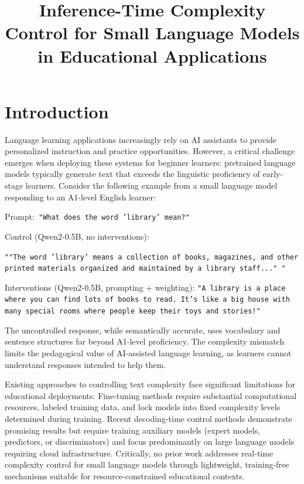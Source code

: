 \documentclass[10pt, a4paper]{article}
\title{Inference-Time Complexity Control for Small Language Models in Educational Applications}
\begin{document}
\maketitleabstract
\section{Introduction}
Language learning applications increasingly rely on AI assistants to provide personalized instruction and practice opportunities. However, a critical challenge emerges when deploying these systems for beginner learners: pretrained language models typically generate text that exceeds the linguistic proficiency of early-stage learners. Consider the following example from a small language model responding to an A1-level English learner:

Prompt:\texttt{ "What does the word 'library' mean?"}

Control (Qwen2-0.5B, no interventions):

\texttt{""The word 'library' means a collection of books, magazines, and other printed 
materials organized and maintained by a library staff..."
"}

Interventions (Qwen2-0.5B, prompting + weighting):
\texttt{"A library is a place where you can find lots of books to read. It's like a 
big house with many special rooms where people keep their toys and stories!"}

The uncontrolled response, while semantically accurate, uses vocabulary and sentence structures far beyond A1-level proficiency.
The complexity mismatch limits the pedagogical value of AI-assisted language learning, as learners cannot understand responses intended to help them.

Existing approaches to controlling text complexity face significant limitations for educational deployments:
Fine-tuning methods require substantial computational resources, labeled training data, and lock models into fixed complexity levels determined during training. Recent decoding-time control methods demonstrate promising results but require training auxiliary models (expert models, predictors, or discriminators) and focus predominantly on large language models requiring cloud infrastructure. Critically, no prior work addresses real-time complexity control for small language models through lightweight, training-free mechanisms suitable for resource-constrained educational contexts.


\end{document}
